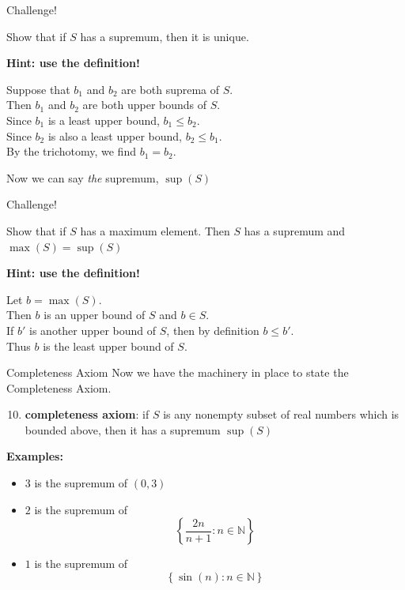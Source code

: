 \documentclass{beamer}
\begin{document}
\begin{frame}{Challenge!}
\begin{prob}
Show that if $S$ has a supremum, then it is unique.
\end{prob}
\pause
\textbf{Hint: use the definition!}
\pause
\begin{soln}
Suppose that $b_1$ and $b_2$ are both suprema of $S$.\\
\pause
Then $b_1$ and $b_2$ are both upper bounds of $S$.\\
\pause
Since $b_1$ is a least upper bound, $b_1\leq b_2$.\\
\pause
Since $b_2$ is also a least upper bound, $b_2\leq b_1$.\\
\pause
By the trichotomy, we find $b_1=b_2$.
\end{soln}
\pause
Now we can say \emph{the} supremum, $\sup(S)$
\end{frame}

\begin{frame}{Challenge!}
\begin{prob}
Show that if $S$ has a maximum element.  Then $S$ has a supremum and $\max(S)=\sup(S)$
\end{prob}
\pause
\textbf{Hint: use the definition!}
\pause
\begin{soln}
Let $b=\max(S)$.\\
\pause
Then $b$ is an upper bound of $S$ and $b\in S$.\\
\pause
If $b'$ is another upper bound of $S$, then by definition $b\leq b'$.\\
\pause
Thus $b$ is the least upper bound of $S$.
\end{soln}
\end{frame}

\begin{frame}{Completeness Axiom}
Now we have the machinery in place to state the Completeness Axiom.
\pause
\begin{enumerate}[\text{A}1]
\setcounter{enumi}{9}
\pause
\item \textbf{completeness axiom}: if $S$ is any nonempty subset of real numbers which is bounded above, then it has a supremum $\sup(S)$
\end{enumerate}
\pause
\textbf{Examples:}
\begin{itemize}
\pause
\item $3$ is the supremum of $(0,3)$
\pause
\item $2$ is the supremum of
$$\left\lbrace
\frac{2n}{n+1}: n\in\mathbb{N}
\right\rbrace$$
\pause
\item $1$ is the supremum of
$$\left\lbrace
\sin(n): n\in\mathbb{N}
\right\rbrace$$
\end{itemize}
\end{frame}
\end{document}
